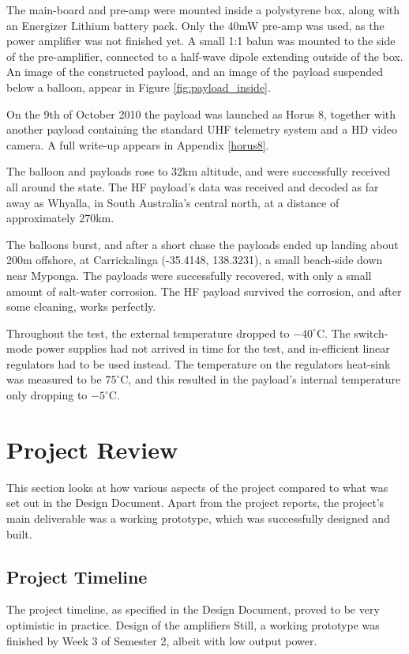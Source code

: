 \documentclass[a4paper,12pt]{article}
\begin{document}
The main-board and pre-amp were mounted inside a polystyrene box, along with an Energizer Lithium battery pack. Only the 40mW pre-amp was used, as the power amplifier was not finished yet. A small 1:1 balun was mounted to the side of the pre-amplifier, connected to a half-wave dipole extending outside of the box. An image of the constructed payload, and an image of the payload suspended below a balloon, appear in Figure \ref{fig:payload_inside}.

On the 9th of October 2010 the payload was launched as Horus 8, together with another payload containing the standard UHF telemetry system and a HD video camera. A full write-up appears in Appendix \ref{horus8}. 

The balloon and payloads rose to 32km altitude, and were successfully received all around the state. The HF payload's data was received and decoded as far away as Whyalla, in South Australia's central north, at a distance of approximately 270km. 

The balloons burst, and after a short chase the payloads ended up landing about 200m offshore, at Carrickalinga (-35.4148, 138.3231), a small beach-side down near Myponga. The payloads were successfully recovered, with only a small amount of salt-water corrosion. The HF payload survived the corrosion, and after some cleaning, works perfectly.

Throughout the test, the external temperature dropped to $-40^\circ$C. The switch-mode power supplies had not arrived in time for the test, and in-efficient linear regulators had to be used instead. The temperature on the regulators heat-sink was measured to be $75^\circ$C, and this resulted in the payload's internal temperature only dropping to $-5^\circ$C.


\section{Project Review}
This section looks at how various aspects of the project compared to what was set out in the Design Document\citep{ref:designdoc}. Apart from the project reports, the project's main deliverable was a working prototype, which was successfully designed and built.

\subsection{Project Timeline}
The project timeline, as specified in the Design Document, proved to be very optimistic in practice. Design of the amplifiers  Still, a working prototype was finished by Week 3 of Semester 2, albeit with low output power.
\end{document}

